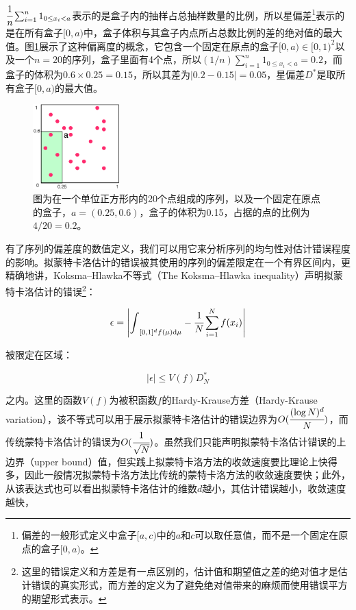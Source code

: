 \noindent $ \cfrac{1}{n}\sum^{n}_{i=1}1_{0\leq x_i<a}$表示的是盒子内的抽样占总抽样数量的比例，所以星偏差\footnote{偏差的一般形式定义中盒子$[a,c)$中的$a$和$c$可以取任意值，而不是一个固定在原点的盒子$[0,a)$。}表示的是在所有盒子$[0,a)$中，盒子体积与其盒子内点所占总数比例的差的绝对值的最大值。图\ref{f:mc-discrepancy}展示了这种偏离度的概念，它包含一个固定在原点的盒子$[0,a)\in [0,1)^2$以及一个$n=20$的序列，盒子里面有4个点，所以$(1/n)\sum^{n}_{i=1}1_{0\leq x_i<a}=0.2$，而盒子的体积为$0.6\times 0.25=0.15$，所以其差为$|0.2-0.15|=0.05$，星偏差$D^{*}$是取所有盒子$[0,a)$的最大值。

\begin{figure}
	\sidecaption
	\includegraphics[width=0.3\textwidth]{figures/mc/discrepancy}
	\caption{图为在一个单位正方形内的20个点组成的序列，以及一个固定在原点的盒子，$a=(0.25,0.6)$，盒子的体积为0.15，占据的点的比例为$4/20=0.2$。}
	\label{f:mc-discrepancy}
\end{figure}

有了序列的偏差度的数值定义，我们可以用它来分析序列的均匀性对估计错误程度的影响。拟蒙特卡洛估计的错误被其使用的序列的偏差限定在一个有界区间内，更精确地讲，Koksma–Hlawka不等式（The Koksma–Hlawka inequality）声明拟蒙特卡洛估计的错误\footnote{这里的错误定义和方差是有一点区别的，估计值和期望值之差的绝对值才是估计错误的真实形式，而方差的定义为了避免绝对值带来的麻烦而使用错误平方的期望形式表示。}：

\begin{equation}
	\epsilon=\Bigg| {\rm \int}_{[0,1]^{d}f(\mu){\rm d}\mu}- \cfrac{1}{N}\sum^{N}_{i=1}f(x_i) \Bigg|
\end{equation}

\noindent 被限定在区域：

\begin{equation}
	|\epsilon |\leq V(f)D^{*}_{N}
\end{equation}

\noindent 之内。这里的函数$V(f)$为被积函数$f$的Hardy-Krause方差（Hardy-Krause variation），该不等式可以用于展示拟蒙特卡洛估计的错误边界为$O( \cfrac{(\log{N})^{d}}{N})$，而传统蒙特卡洛估计的错误为$O( \cfrac{1}{\sqrt{N}})$。虽然我们只能声明拟蒙特卡洛估计错误的上边界（upper bound）值，但实践上拟蒙特卡洛方法的收敛速度要比理论上快得多，因此一般情况拟蒙特卡洛方法比传统的蒙特卡洛方法的收敛速度要快；此外，从该表达式也可以看出拟蒙特卡洛估计的维数$d$越小，其估计错误越小，收敛速度越快，





